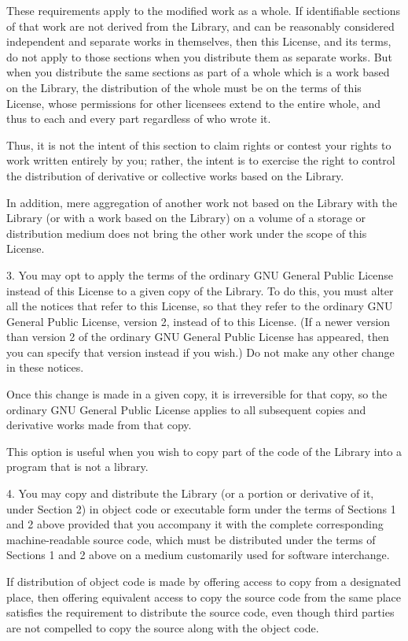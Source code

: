 \documentclass[a4paper,twoside]{tceusermanual}
\begin{document}
These requirements apply to the modified work as a whole.  If
identifiable sections of that work are not derived from the
Library, and can be reasonably considered independent and
separate works in themselves, then this License, and its terms,
do not apply to those sections when you distribute them as
separate works.  But when you distribute the same sections as
part of a whole which is a work based on the Library, the
distribution of the whole must be on the terms of this License,
whose permissions for other licensees extend to the entire
whole, and thus to each and every part regardless of who wrote
it.

Thus, it is not the intent of this section to claim rights or
contest your rights to work written entirely by you; rather, the
intent is to exercise the right to control the distribution of
derivative or collective works based on the Library.

In addition, mere aggregation of another work not based on the
Library with the Library (or with a work based on the Library)
on a volume of a storage or distribution medium does not bring
the other work under the scope of this License.

3. You may opt to apply the terms of the ordinary GNU General
Public License instead of this License to a given copy of the
Library.  To do this, you must alter all the notices that refer
to this License, so that they refer to the ordinary GNU General
Public License, version 2, instead of to this License.  (If a
newer version than version 2 of the ordinary GNU General Public
License has appeared, then you can specify that version instead
if you wish.)  Do not make any other change in these notices.
 
Once this change is made in a given copy, it is irreversible for
that copy, so the ordinary GNU General Public License applies to
all subsequent copies and derivative works made from that copy.

This option is useful when you wish to copy part of the code of
the Library into a program that is not a library.

4. You may copy and distribute the Library (or a portion or
derivative of it, under Section 2) in object code or executable
form under the terms of Sections 1 and 2 above provided that you
accompany it with the complete corresponding machine-readable
source code, which must be distributed under the terms of
Sections 1 and 2 above on a medium customarily used for software
interchange.

If distribution of object code is made by offering access to
copy from a designated place, then offering equivalent access to
copy the source code from the same place satisfies the
requirement to distribute the source code, even though third
parties are not compelled to copy the source along with the
object code.
\end{document}
